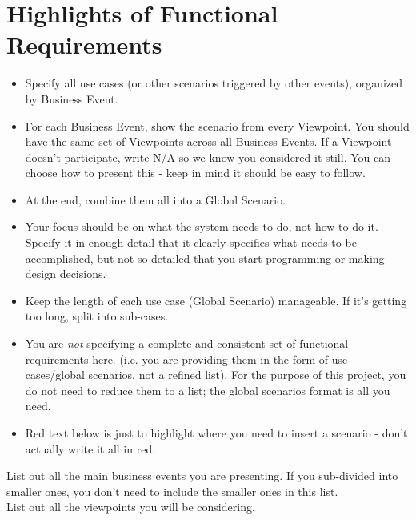 \documentclass[]{article}
\begin{document}
\section{Highlights of Functional Requirements}
\label{sec:functional_requirements}
\begin{itemize}
	\item Specify all use cases (or other scenarios triggered by other events), organized by Business Event. 
	\item For each Business Event, show the scenario from every Viewpoint. You should have the same set of Viewpoints across all Business Events. If a Viewpoint doesn't participate, write N/A so we know you considered it still. You can choose how to present this - keep in mind it should be easy to follow. 
	\item At the end, combine them all into a Global Scenario.
	\item Your focus should be on what the system needs to do, not how to do it. Specify it in enough detail that it clearly specifies what needs to be accomplished, but not so detailed that you start programming or making design decisions.
	\item Keep the length of each use case (Global Scenario) manageable. If it's getting too long, split into sub-cases.
	\item You are \emph{not} specifying a complete and consistent set of functional requirements here. (i.e. you are providing them in the form of use cases/global scenarios, not a refined list). For the purpose of this project, you do not need to reduce them to a list; the global scenarios format is all you need.
	\item Red text below is just to highlight where you need to insert a scenario - don't actually write it all in red.
\end{itemize}

 List out all the main business events you are presenting. If you sub-divided into smaller ones, you don't need to include the smaller ones in this list.\\

 List out all the viewpoints you will be considering.\\
\end{document}
